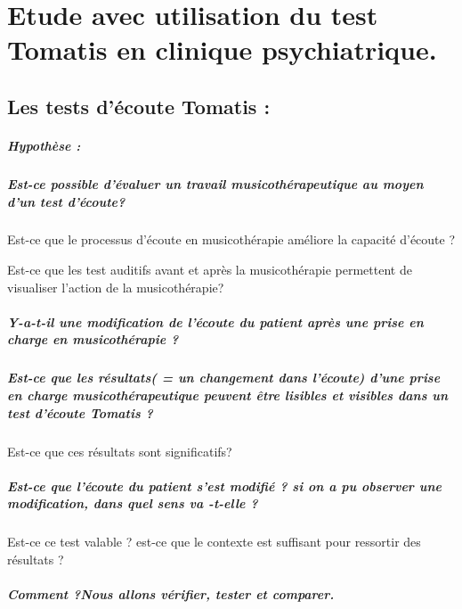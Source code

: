\chapter{Etude avec utilisation du test Tomatis en clinique psychiatrique.}

\section{Les tests d'écoute Tomatis : }

\paragraph{Hypothèse :}

\paragraph{Est-ce possible d'évaluer un travail musicothérapeutique au moyen
d'un test d'écoute?}

Est-ce que le processus d'écoute en musicothérapie améliore la capacité
d'écoute ?

Est-ce que les test auditifs avant et après la musicothérapie permettent
de visualiser l'action de la musicothérapie?

\paragraph{Y-a-t-il une modification de l'écoute du patient après une prise
en charge en musicothérapie ?}

\paragraph{Est-ce que les résultats( = un changement dans l'écoute) d'une prise
en charge musicothérapeutique peuvent être lisibles et visibles dans
un test d'écoute Tomatis ?}

Est-ce que ces résultats sont significatifs? 

\paragraph{Est-ce que l'écoute du patient s'est modifié ? si on a pu observer
une modification, dans quel sens va -t-elle ?}

Est-ce ce test valable ? est-ce que le contexte est suffisant pour
ressortir des résultats ?

\paragraph{Comment ?Nous allons vérifier, tester et comparer.}

